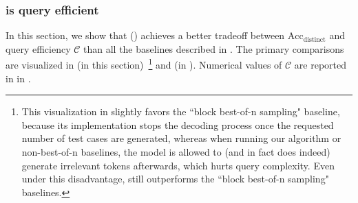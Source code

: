 \clearpage
\subsubsection{\algoName is query efficient}
\label{sec:experiments:codellama:efficient}

In this section, we show that 
\algoName ()
achieves a better tradeoff between $\text{Acc}_\text{distinct}$
and
query efficiency $\mathcal{C}$
than all the baselines described in .
The primary comparisons are visualized in  (in this section)~\footnote{
    This visualization in  slightly favors the ``block best-of-n sampling" baseline, 
    because its implementation stops the decoding process once the requested number of test cases are generated, 
    whereas when running our algorithm or non-best-of-n baselines, 
    the model is allowed to (and in fact does indeed) generate irrelevant tokens afterwards, 
    which hurts query complexity.
    Even under this disadvantage, 
    \algoName still outperforms the ``block best-of-n sampling" baselines.
}
and 
(in ).
Numerical values of $\mathcal{C}$ are reported in
in . 

    


